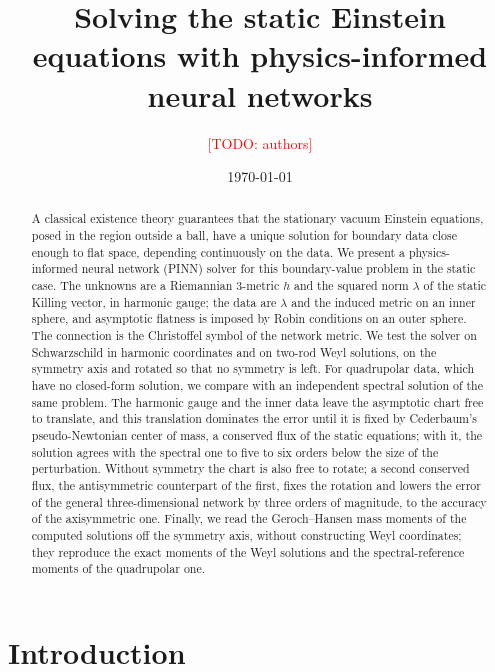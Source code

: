 \documentclass[aps,prd,twocolumn,superscriptaddress, nofootinbib,floatfix]{revtex4-2}
\newcommand{\todo}[1]{\textcolor{red}{[TODO: #1]}}
\begin{document}
\title{Solving the static Einstein equations with physics-informed neural networks}

\author{\todo{authors}}
\affiliation{\todo{affiliations}}

\date{\today}

\begin{abstract}
A classical existence theory guarantees that the stationary vacuum Einstein equations, posed in the region outside a ball, have a unique solution for boundary data close enough to flat space, depending continuously on the data.
We present a physics-informed neural network (PINN) solver for this boundary-value problem in the static case.
The unknowns are a Riemannian 3-metric $h$ and the squared norm $\lambda$ of the static Killing vector, in harmonic gauge; the data are $\lambda$ and the induced metric on an inner sphere, and asymptotic flatness is imposed by Robin conditions on an outer sphere.
The connection is the Christoffel symbol of the network metric.
We test the solver on Schwarzschild in harmonic coordinates and on two-rod Weyl solutions, on the symmetry axis and rotated so that no symmetry is left.
For quadrupolar data, which have no closed-form solution, we compare with an independent spectral solution of the same problem.
The harmonic gauge and the inner data leave the asymptotic chart free to translate, and this translation dominates the error until it is fixed by Cederbaum's pseudo-Newtonian center of mass, a conserved flux of the static equations; with it, the solution agrees with the spectral one to five to six orders below the size of the perturbation.
Without symmetry the chart is also free to rotate; a second conserved flux, the antisymmetric counterpart of the first, fixes the rotation and lowers the error of the general three-dimensional network by three orders of magnitude, to the accuracy of the axisymmetric one.
Finally, we read the Geroch--Hansen mass moments of the computed solutions off the symmetry axis, without constructing Weyl coordinates; they reproduce the exact moments of the Weyl solutions and the spectral-reference moments of the quadrupolar one.
\end{abstract}

\maketitle

\section{Introduction}
\end{document}
